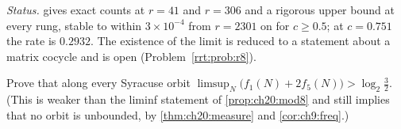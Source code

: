 \emph{Status.}  gives exact counts at $r=41$ and $r=306$ and a rigorous upper bound at every rung, stable to within $3\times10^{-4}$ from $r=2301$ on for $c\ge0.5$; at $c=0.751$ the rate is $0.2932$. The existence of the limit is reduced to a statement about a matrix cocycle and is open (Problem~\ref{rrt:prob:r8}).

\begin{problem*}\label{prob:ch20:limsup}
Prove that along every Syracuse orbit $\limsup_N\bigl(f_1(N)+2f_5(N)\bigr)>\log_2\frac32$. (This is weaker than the liminf statement of \cref{prop:ch20:mod8} and still implies that no orbit is unbounded, by \cref{thm:ch20:measure} and \cref{cor:ch9:freq}.)
\end{problem*}
